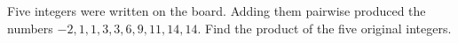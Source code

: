 Five integers were written on the board. Adding them pairwise produced the numbers $-2, 1, 1, 3, 3, 6, 9, 11, 14, 14$. Find the product of the five original integers.
